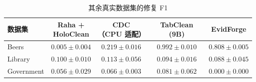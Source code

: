 \begin{table}[tb]
\centering
\caption{其余真实数据集的修复 F1}
\label{tab:real-remaining}
\fontsize{8}{9.6}\selectfont
\setlength{\tabcolsep}{2pt}
\renewcommand{\arraystretch}{1.10}
\begin{tabular*}{\columnwidth}{@{\extracolsep{\fill}}lcccc@{}}
\toprule
数据集 & \makecell{Raha +\\HoloClean} & \makecell{CDC\\（CPU 适配）} & TabClean (9B) & EvidForge \\
\midrule
Beers & $0.005\pm0.004$ & $0.219\pm0.016$ & $\mathbf{0.992\pm0.010}$ & $0.808\pm0.005$ \\
Library & $0.100\pm0.010$ & $\mathbf{0.113\pm0.056}$ & $0.094\pm0.016$ & $0.088\pm0.045$ \\
Government & $0.056\pm0.029$ & $0.066\pm0.003$ & $\mathbf{0.081\pm0.062}$ & $0.000\pm0.000$ \\
\bottomrule
\end{tabular*}
\end{table}
